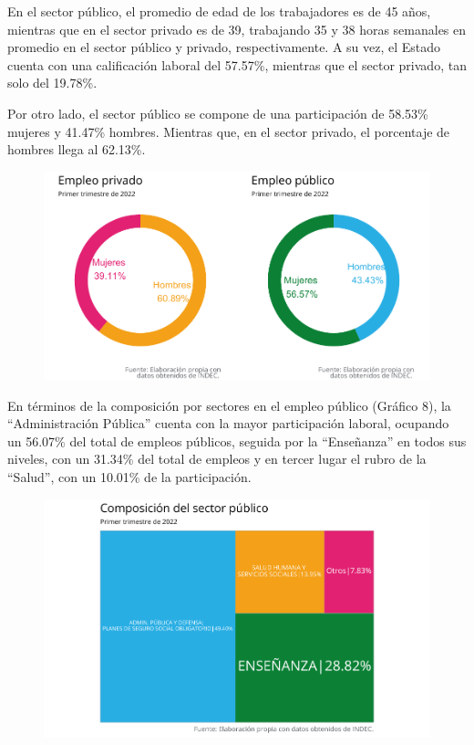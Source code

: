 \documentclass[
]{article}
\begin{document}
En el sector público, el promedio de edad de los trabajadores es de 45
años, mientras que en el sector privado es de 39, trabajando 35 y 38
horas semanales en promedio en el sector público y privado,
respectivamente. A su vez, el Estado cuenta con una calificación laboral
del 57.57\%, mientras que el sector privado, tan solo del 19.78\%.

Por otro lado, el sector público se compone de una participación de
58.53\% mujeres y 41.47\% hombres. Mientras que, en el sector privado,
el porcentaje de hombres llega al 62.13\%.


\begin{figure}[htp]
\includegraphics{Informe-Mercado-Laboral_files/figure-latex/unnamed-chunk-30-1.pdf}
\caption{}
\end{figure}

\newpage
En términos de la composición por sectores en el empleo público (Gráfico
8), la ``Administración Pública'' cuenta con la mayor participación
laboral, ocupando un 56.07\% del total de empleos públicos, seguida por
la ``Enseñanza'' en todos sus niveles, con un 31.34\% del total de
empleos y en tercer lugar el rubro de la ``Salud'', con un 10.01\% de la
participación.

\begin{figure}[htbp]
\includegraphics{Informe-Mercado-Laboral_files/figure-latex/unnamed-chunk-32-1.pdf}
\caption{}
\end{figure}
\end{document}
